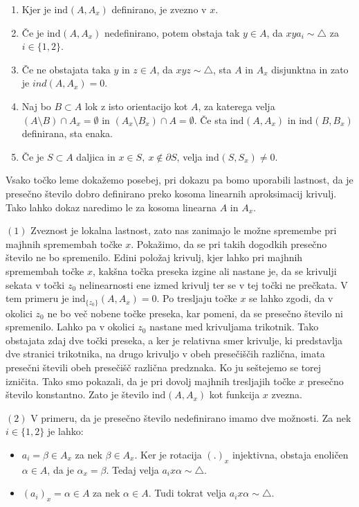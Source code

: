 \documentclass[mat1]{fmfdelo}
\newcommand{\ind}[3][]{\text{ind}_{#1}(#2, #3)}
\begin{document}
\begin{lema}\label{le:lema2}
\begin{enumerate}
\item Kjer je $\ind{A}{A_x}$ definirano, je zvezno v $x$.
\item Če je $\ind{A}{A_x}$ nedefinirano, potem obstaja tak $y \in A$, da $xya_i \sim \triangle$ za $i \in \{1, 2\}$.
\item Če ne obstajata taka $y$ in $z \in A$, da $xyz \sim \triangle$, sta $A$ in $A_x$ disjunktna in zato je $ind(A, A_x) = 0$.
\item Naj bo $B \subset A$ lok z isto orientacijo kot $A$, za katerega velja $(A \setminus B) \cap A_x = \emptyset$ in $(A_x \setminus B_x) \cap A = \emptyset$. Če sta $\ind{A}{A_x}$ in $\ind{B}{B_x}$ definirana, sta enaka.
\item Če je $S \subset A$ daljica in $x \in S,\ x \notin \partial S$, velja $\ind{S}{S_x} \neq 0$.
\end{enumerate}
\end{lema}

\proof
Vsako točko leme dokažemo posebej, pri dokazu pa bomo uporabili lastnost, da je presečno število dobro definirano preko kosoma linearnih aproksimacij krivulj. Tako lahko dokaz naredimo le za kosoma linearna $A$ in $A_x$.

$(1)$ Zveznost je lokalna lastnost, zato nas zanimajo le možne spremembe pri majhnih spremembah točke $x$. Pokažimo, da se pri takih dogodkih presečno število ne bo spremenilo. Edini položaj krivulj, kjer lahko pri majhnih spremembah točke $x$, kakšna točka preseka izgine ali nastane je, da se krivulji sekata v točki $z_0$ nelinearnosti ene izmed krivulj ter se v tej točki ne prečkata. V tem primeru je $\ind[\{z_0\}]{A}{A_x}=0$. Po tresljaju točke $x$ se lahko zgodi, da v okolici $z_0$ ne bo več nobene točke preseka, kar pomeni, da se presečno število ni spremenilo. Lahko pa v okolici $z_0$ nastane med krivuljama trikotnik. Tako obstajata zdaj dve točki preseka, a ker je relativna smer krivulje, ki predstavlja dve stranici trikotnika, na drugo krivuljo v obeh presečiščih različna, imata presečni števili obeh presečišč različna predznaka. Ko ju seštejemo se torej izničita. Tako smo pokazali, da je pri dovolj majhnih tresljajih točke $x$ presečno število konstantno. Zato je število $\ind{A}{A_x}$ kot funkcija $x$ zvezna.

$(2)$ V primeru, da je presečno število nedefinirano imamo dve možnosti. Za nek $i \in \{1, 2\}$ je lahko: 
\begin{itemize}
\item $a_i = \beta \in A_x$ za nek $\beta \in A_x$. Ker je rotacija $(.)_x$ injektivna, obstaja enoličen $\alpha \in A$, da je $\alpha_x = \beta$. Tedaj velja $a_ix\alpha \sim \triangle$.
\item $(a_i)_x  = \alpha \in A$ za nek $\alpha \in A$. Tudi tokrat velja $a_ix\alpha \sim \triangle$.
\end{itemize}
\end{document}
